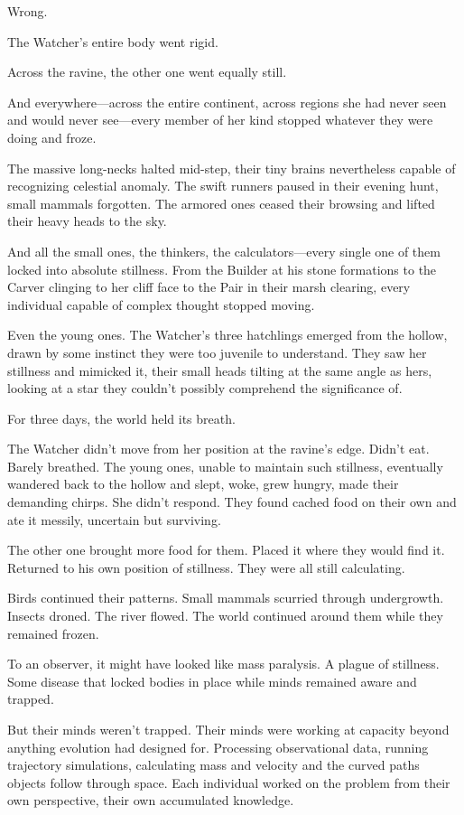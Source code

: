 Wrong.

The Watcher's entire body went rigid.

Across the ravine, the other one went equally still.

And everywhere—across the entire continent, across regions she had never seen and would never see—every member of her kind stopped whatever they were doing and froze.

The massive long-necks halted mid-step, their tiny brains nevertheless capable of recognizing celestial anomaly. The swift runners paused in their evening hunt, small mammals forgotten. The armored ones ceased their browsing and lifted their heavy heads to the sky.

And all the small ones, the thinkers, the calculators—every single one of them locked into absolute stillness. From the Builder at his stone formations to the Carver clinging to her cliff face to the Pair in their marsh clearing, every individual capable of complex thought stopped moving.

Even the young ones. The Watcher's three hatchlings emerged from the hollow, drawn by some instinct they were too juvenile to understand. They saw her stillness and mimicked it, their small heads tilting at the same angle as hers, looking at a star they couldn't possibly comprehend the significance of.

For three days, the world held its breath.

\scenebreak

The Watcher didn't move from her position at the ravine's edge. Didn't eat. Barely breathed. The young ones, unable to maintain such stillness, eventually wandered back to the hollow and slept, woke, grew hungry, made their demanding chirps. She didn't respond. They found cached food on their own and ate it messily, uncertain but surviving.

The other one brought more food for them. Placed it where they would find it. Returned to his own position of stillness. They were all still calculating.

Birds continued their patterns. Small mammals scurried through undergrowth. Insects droned. The river flowed. The world continued around them while they remained frozen.

To an observer, it might have looked like mass paralysis. A plague of stillness. Some disease that locked bodies in place while minds remained aware and trapped.

But their minds weren't trapped. Their minds were working at capacity beyond anything evolution had designed for. Processing observational data, running trajectory simulations, calculating mass and velocity and the curved paths objects follow through space. Each individual worked on the problem from their own perspective, their own accumulated knowledge.

